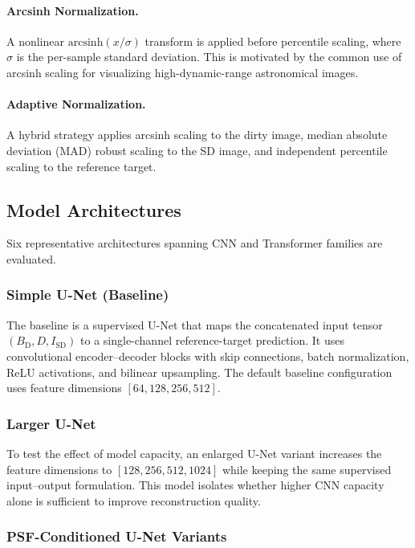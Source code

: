 \documentclass[twocolumn]{aastex631}
\begin{document}
\paragraph{Arcsinh Normalization.}
A nonlinear $\mathrm{arcsinh}(x/\sigma)$ transform is applied before percentile scaling, where $\sigma$ is the per-sample standard deviation.
This is motivated by the common use of arcsinh scaling for visualizing high-dynamic-range astronomical images.

\paragraph{Adaptive Normalization.}
A hybrid strategy applies arcsinh scaling to the dirty image, median absolute deviation (MAD) robust scaling to the SD image, and independent percentile scaling to the reference target.

\subsection{Model Architectures}
\label{sec:architectures}

Six representative architectures spanning CNN and Transformer families are evaluated.

\subsubsection{Simple U-Net (Baseline)}

The baseline is a supervised U-Net \citep{Ronneberger2015} that maps the concatenated input tensor $(B_{\mathrm{D}}, D, I_{\mathrm{SD}})$ to a single-channel reference-target prediction.
It uses convolutional encoder--decoder blocks with skip connections, batch normalization, ReLU activations, and bilinear upsampling.
The default baseline configuration uses feature dimensions $[64, 128, 256, 512]$.

\subsubsection{Larger U-Net}

To test the effect of model capacity, an enlarged U-Net variant increases the feature dimensions to $[128, 256, 512, 1024]$ while keeping the same supervised input--output formulation.
This model isolates whether higher CNN capacity alone is sufficient to improve reconstruction quality.

\subsubsection{PSF-Conditioned U-Net Variants}
\end{document}
